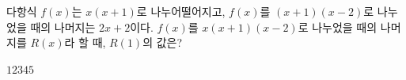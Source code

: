 다항식 $f(x)$는 $x(x+1)$로 나누어떨어지고, $f(x)$를 $(x+1)(x-2)$로 나누었을 때의 나머지는 $2x+2$이다. $f(x)$를 $x(x+1)(x-2)$로 나누었을 때의 나머지를 $R(x)$라 할 때, $R(1)$의 값은?
\begin{choices32}{$1$}{$2$}{$3$}{$4$}{$5$}\end{choices32}
